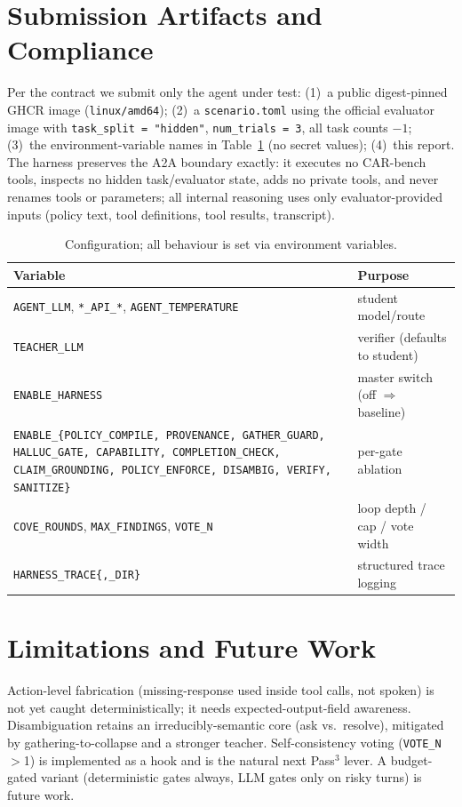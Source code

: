 \documentclass{article}
\begin{document}
\section{Submission Artifacts and Compliance}
Per the contract we submit only the agent under test: (1)~a public digest-pinned GHCR
image (\texttt{linux/amd64}); (2)~a \texttt{scenario.toml} using the official evaluator
image with \texttt{task\_split = "hidden"}, \texttt{num\_trials = 3}, all task counts
$-1$; (3)~the environment-variable names in Table~\ref{tab:cfg} (no secret values);
(4)~this report. The harness preserves the A2A boundary exactly: it executes no
CAR-bench tools, inspects no hidden task/evaluator state, adds no private tools, and
never renames tools or parameters; all internal reasoning uses only evaluator-provided
inputs (policy text, tool definitions, tool results, transcript).

\begin{table}[t]
\centering\small
\begin{tabular}{@{}p{3.4cm}p{4.0cm}@{}}
\toprule
Variable & Purpose\\
\midrule
\texttt{AGENT\_LLM}, \texttt{*\_API\_*}, \texttt{AGENT\_TEMPERATURE} & student model/route\\
\texttt{TEACHER\_LLM} & verifier (defaults to student)\\
\texttt{ENABLE\_HARNESS} & master switch (off $\Rightarrow$ baseline)\\
\texttt{ENABLE\_\{POLICY\_COMPILE, PROVENANCE, GATHER\_GUARD, HALLUC\_GATE, CAPABILITY, COMPLETION\_CHECK, CLAIM\_GROUNDING, POLICY\_ENFORCE, DISAMBIG, VERIFY, SANITIZE\}} & per-gate ablation\\
\texttt{COVE\_ROUNDS}, \texttt{MAX\_FINDINGS}, \texttt{VOTE\_N} & loop depth / cap / vote width\\
\texttt{HARNESS\_TRACE\{,\_DIR\}} & structured trace logging\\
\bottomrule
\end{tabular}
\caption{Configuration; all behaviour is set via environment variables.}
\label{tab:cfg}
\end{table}

\section{Limitations and Future Work}
Action-level fabrication (missing-response used inside tool calls, not spoken) is not
yet caught deterministically; it needs expected-output-field awareness. Disambiguation
retains an irreducibly-semantic core (ask vs.\ resolve), mitigated by
gathering-to-collapse and a stronger teacher. Self-consistency voting
(\texttt{VOTE\_N}$>$1) is implemented as a hook and is the natural next Pass$^3$ lever.
A budget-gated variant (deterministic gates always, LLM gates only on risky turns) is
future work.
\end{document}

